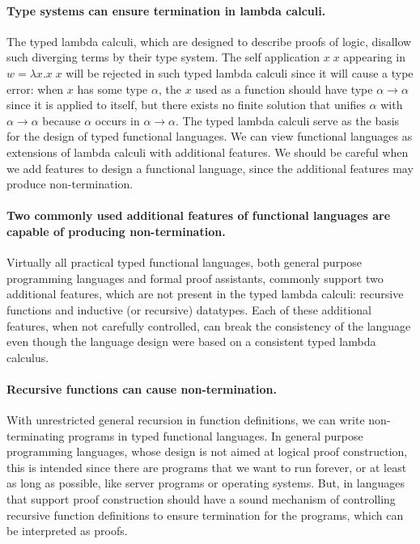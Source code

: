 \documentclass[letterpaper,12pt]{article}
\begin{document}
\paragraph{Type systems can ensure termination in lambda calculi.}
The typed lambda calculi, which are designed to describe proofs of logic,
disallow such diverging terms by their type system. The self application 
$x\;x$ appearing in $w=\lambda x.x\;x$ will be rejected in such typed lambda
calculi since it will cause a type error: when $x$ has some type $\alpha$,
the $x$ used as a function should have type $\alpha\to\alpha$ since it is
applied to itself, but there exists no finite solution that unifies
$\alpha$ with $\alpha\to\alpha$ because $\alpha$ occurs in $\alpha\to\alpha$.
The typed lambda calculi serve as the basis for the design of
typed functional languages.  We can view functional languages
as extensions of lambda calculi with additional features.
We should be careful when we add features to design a functional language,
since the additional features may produce non-termination.

\paragraph{Two commonly used additional features of functional languages are
capable of producing non-termination.}
Virtually all practical typed functional languages, both general purpose
programming languages and formal proof assistants, commonly support
two additional features, which are not present in the typed lambda calculi: recursive functions and inductive (or recursive) datatypes.
Each of these additional features, when not carefully controlled, can
break the consistency of the language even though the language design
were based on a consistent typed lambda calculus.

\paragraph{Recursive functions can cause non-termination.}
With unrestricted general recursion in function definitions,
we can write non-terminating programs in typed functional languages.
In general purpose programming languages, whose design is not aimed at logical
proof construction, this is intended since there are programs that we want to
run forever, or at least as long as possible, like server programs or
operating systems.  But, in languages that support proof construction
should have a sound mechanism of controlling recursive function definitions
to ensure termination for the programs, which can be interpreted as
proofs.
\end{document}
